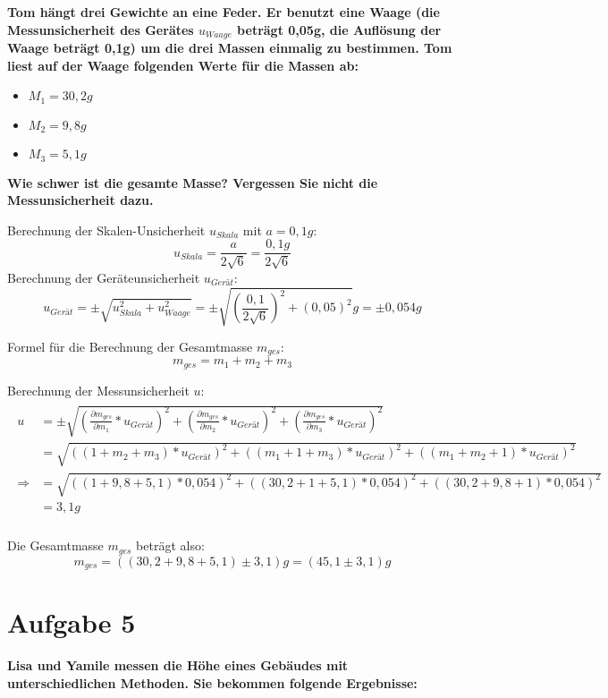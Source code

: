 \documentclass[
]{article}
\providecommand{\tightlist}{%
  \setlength{\itemsep}{0pt}\setlength{\parskip}{0pt}}
\begin{document}
\textbf{Tom hängt drei Gewichte an eine Feder. Er benutzt eine Waage
(die Messunsicherheit des Gerätes \(u_{Waage}\) beträgt 0,05g, die
Auflösung der Waage beträgt 0,1g) um die drei Massen einmalig zu
bestimmen. Tom liest auf der Waage folgenden Werte für die Massen ab:}

\begin{itemize}
\tightlist
\item
  \(M_1= 30,2 g\)
\item
  \(M_2= 9,8 g\)
\item
  \(M_3= 5,1 g\)
\end{itemize}

\textbf{Wie schwer ist die gesamte Masse? Vergessen Sie nicht die
Messunsicherheit dazu.}

Berechnung der Skalen-Unsicherheit \(u_{Skala}\) mit \(a=0,1g\):
\[u_{Skala} = \frac{a}{2\sqrt{6}} = \frac{0,1g}{2\sqrt{6}}\] Berechnung
der Geräteunsicherheit \(u_{Gerät}\):
\[u_{Gerät} =\pm \sqrt{u_{Skala}^2+u_{Waage}^2} =\pm \sqrt{(\frac{0,1}{2\sqrt{6}})^2+(0,05)^2}g = \pm 0,054g\]

Formel für die Berechnung der Gesamtmasse \(m_{ges}\):
\[m_{ges} = m_1+m_2+m_3\]

Berechnung der Messunsicherheit \(u\): \begin{align*}
\begin{split}
u&=\pm \sqrt{(\frac{\partial m_{ges}}{\partial m_1}*u_{Gerät})^2+(\frac{\partial m_{ges}}{\partial m_2}*u_{Gerät})^2+(\frac{\partial m_{ges}}{\partial m_3}*u_{Gerät})^2}\\
 &= \sqrt{((1+m_2+m_3)*u_{Gerät})^2+((m_1+1+m_3)*u_{Gerät})^2+((m_1+m_2+1)*u_{Gerät})^2}\\
\Rightarrow &= \sqrt{((1+9,8+5,1)*0,054)^2+((30,2+1+5,1)*0,054)^2+((30,2+9,8+1)*0,054)^2}\\
&= 3,1g\\
\end{split}
\end{align*}

Die Gesamtmasse \(m_{ges}\) beträgt also:
\[m_{ges}=((30,2+9,8+5,1)\pm 3,1)g = (45,1 \pm 3,1)g\]

\hypertarget{aufgabe-5}{%
\section{Aufgabe 5}\label{aufgabe-5}}

\textbf{Lisa und Yamile messen die Höhe eines Gebäudes mit
unterschiedlichen Methoden. Sie bekommen folgende Ergebnisse:}
\end{document}
